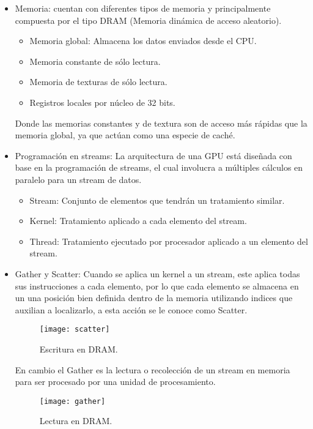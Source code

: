 \begin{itemize}
\item Memoria: cuentan con diferentes tipos de memoria y principalmente compuesta por el tipo \acrshort{DRAM} (Memoria dinámica de acceso aleatorio).
	\begin{itemize}
	\item Memoria global: Almacena los datos enviados desde el \acrshort{CPU}.
	\item Memoria constante de sólo lectura.
	\item Memoria de texturas de sólo lectura.
	\item Registros locales por núcleo de 32 bits. 
	\end{itemize}
Donde las memorias constantes y de textura son de acceso más rápidas que la memoria global, ya que actúan como una especie de caché.

\item Programación en streams: La arquitectura de una \acrshort{GPU} está diseñada con base en la programación de streams, el cual involucra a múltiples cálculos en paralelo para un stream de datos\cite{stream}. 

	\begin{itemize}
	\item Stream: Conjunto de elementos que tendrán un tratamiento similar.
	\item Kernel: Tratamiento aplicado a cada elemento del stream.
	\item Thread: Tratamiento ejecutado por procesador aplicado a un elemento del stream.
	\end{itemize} 
	\item Gather y Scatter: Cuando se aplica un kernel a un stream, este aplica todas sus instrucciones a cada elemento, por lo que cada elemento se almacena en un una posición bien definida dentro de la memoria utilizando indices que auxilian a localizarlo, a esta acción se le conoce como Scatter. 

        \begin{figure}[ht]
      \centering
        \texttt{[image: scatter]}
        \caption{Escritura en DRAM\cite{NCUDA}.}
        \label{fig:scatter}
    \end{figure}
   
En cambio el Gather es la lectura o recolección de un stream en memoria para ser procesado por una unidad de procesamiento.

        \begin{figure}[ht]
      \centering
        \texttt{[image: gather]}
        \caption{Lectura en DRAM\cite{NCUDA}.}
        \label{fig:gather}
    \end{figure}

\end{itemize} 
    
